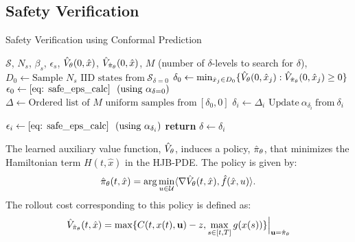 \subsection{Safety Verification}
\begin{algorithm}[t]
\caption{Safety Verification using Conformal Prediction}
\label{alg: cp_safety}
\begin{algorithmic}[1]
\REQUIRE $\mathcal{S}$, $N_s$, $\beta_s$, $\epsilon_s$, $\hat{V}_{\theta}(0, \hat{x})$, $\hat{V}_{\hat{\pi}_{\theta}}(0, \hat{x})$, $M$ (number of $\delta$-levels to search for $\delta$),
    \STATE $D_0 \gets \text{Sample $N_s$ IID states from}~ \mathcal{S}_{\delta=0}$
    \STATE $\delta_0 \gets \min_{\hat{x}_j \in D_0}\{\hat{V}_{\theta}(0, \hat{x}_j): \hat{V}_{\hat{\pi}_{\theta}}(0, \hat{x}_j) \geq 0\}$
     \STATE $\epsilon_0 \gets \eqref{eq: safe_eps_calc} ~~(\text{using}~\alpha_{\delta = 0})$
    \STATE $\Delta \gets \text{Ordered list of $M$ uniform samples from}~[\delta_0, 0]$
    \STATE $\delta_i \gets \Delta_i$
    \STATE $\text{Update}~\alpha_{\delta_i}~\text{from}~{\delta_i}$
    
    \STATE $\epsilon_i \gets \eqref{eq: safe_eps_calc} ~~(\text{using}~\alpha_{\delta_i})$
    \ENDWHILE
    \ENDFOR
\STATE \textbf{return} $\delta \gets \delta_{i}$
\end{algorithmic}
\end{algorithm}
The learned auxiliary value function, $\hat{V}_{\theta}$, induces a policy, $\hat{\pi}_{\theta}$, that minimizes the Hamiltonian term $H(t, \hat{x})$ in the HJB-PDE. The policy is given by:
\begin{equation} \label{eqn:opt_ctrl}
    \hat{\pi}_{\theta}(t, \hat{x})=\arg \min_{u\in \mathcal{U}} \langle\nabla \hat{V}_{\theta}(t, \hat{x}), \hat{f}(\hat{x}, u)\rangle .
\end{equation}
The rollout cost corresponding to this policy is defined as:
\begin{equation}\label{eq: induced_policy}
    \hat{V}_{\hat{\pi}_{\theta}}(t, \hat{x}) = \max \{C(t, x(t), \mathbf{u}) -z, \max_{s \in [t, T]}g(x(s)) \} \Big|_{\mathbf{u} = \hat{\pi}_{\theta}}
\end{equation}
